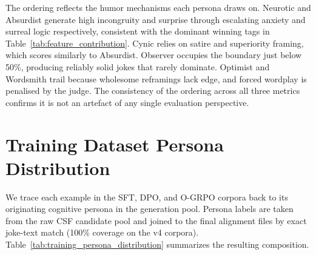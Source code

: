 \documentclass[11pt]{article}
\begin{document}
\begin{table}[H]
\centering
\small
{}
\caption{Per-persona curation-stage performance across three independent metrics. \textit{Pairwise win rate}: fraction of 1v1 judge comparisons won. \textit{Mean rank}: average within-prompt rank out of 24 candidates (lower = better). \textit{Top-3 rate}: fraction of prompts where the persona placed in the top 3. All three metrics converge on the same ordering.}
\label{tab:persona_wins}
\end{table}

The ordering reflects the humor mechanisms each persona draws on. Neurotic and Absurdist generate high incongruity and surprise through escalating anxiety and surreal logic respectively, consistent with the dominant winning tags in Table~\ref{tab:feature_contribution}. Cynic relies on satire and superiority framing, which scores similarly to Absurdist. Observer occupies the boundary just below 50\%, producing reliably solid jokes that rarely dominate. Optimist and Wordsmith trail because wholesome reframings lack edge, and forced wordplay is penalised by the judge. The consistency of the ordering across all three metrics confirms it is not an artefact of any single evaluation perspective.

\section{Training Dataset Persona Distribution}
\label{sec:appendix_training_distribution}

We trace each example in the SFT, DPO, and O-GRPO corpora back to its originating cognitive persona in the generation pool. Persona labels are taken from the raw CSF candidate pool and joined to the final alignment files by exact joke-text match (100\% coverage on the v4 corpora). Table~\ref{tab:training_persona_distribution} summarizes the resulting composition.
\end{document}
